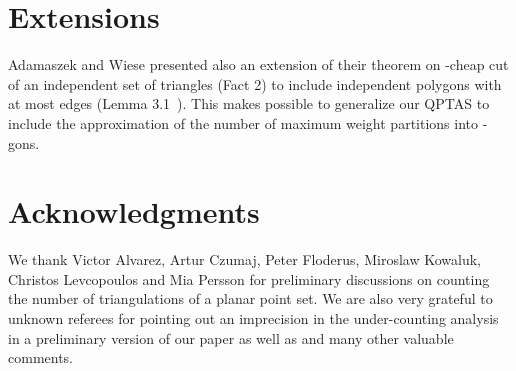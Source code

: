 \documentclass[a4paper]{article}
\begin{document}
\section{Extensions}

Adamaszek and Wiese presented also an extension
of their theorem on -cheap cut of an independent
set of triangles (Fact 2) to include independent
polygons with at most  edges (Lemma 3.1~\cite{AW14}). This makes possible
to generalize our QPTAS
to include the approximation of the number
of maximum weight partitions into -gons.

\section*{Acknowledgments}

We thank Victor Alvarez, Artur Czumaj, Peter Floderus, Miroslaw
Kowaluk, Christos Levcopoulos and Mia Persson for preliminary
discussions on counting the number of triangulations of a planar point
set. We are also very grateful to unknown referees for pointing out an
imprecision in the under-counting analysis in a preliminary version of
our paper as well as and many other valuable comments.
\end{document}
